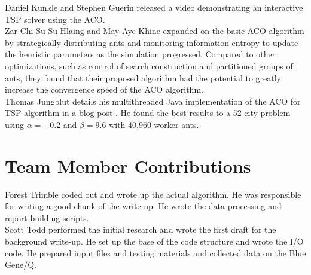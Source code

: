 \documentclass[twocolumn]{article}
\begin{document}
Daniel Kunkle and Stephen Guerin released a video \cite{youtube:aco}
demonstrating an interactive TSP solver using the ACO. \\

Zar Chi Su Su Hlaing and May Aye Khine \cite{ipcsit:aco} expanded on the basic 
ACO algorithm by strategically distributing ants and monitoring information 
entropy to update the heuristic parameters as the simulation progressed. 
Compared to other optimizations, such as control of search construction and 
partitioned groups of ants, they found that their proposed algorithm had the 
potential to greatly increase the convergence speed of the ACO algorithm. \\

Thomas Jungblut details his multithreaded Java implementation of the ACO for TSP
algorithm in a blog post \cite{jungblut:aco}. He found the best results to a 52
city problem using $\alpha=-0.2$ and $\beta=9.6$ with 40,960 worker ants.

\section{Team Member Contributions}

\noindent Forest Trimble coded out and wrote up the actual algorithm. He was 
responsible for writing a good chunk of the write-up. He wrote the data 
processing and report building scripts. \\

\noindent Scott Todd performed the initial research and wrote the first draft 
for the background write-up. He set up the base of the code structure and wrote
the I/O code. He prepared input files and testing materials and collected data 
on the Blue Gene/Q. \\

\nocite{*}


\end{document}
